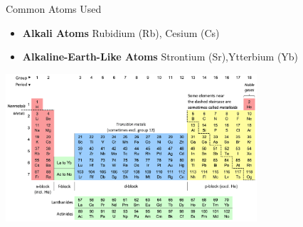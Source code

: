 \documentclass{beamer}
\begin{document}
\begin{frame}{Common Atoms Used}
  \begin{itemize}
    \item \textbf{Alkali Atoms} Rubidium (Rb), Cesium (Cs)
    \item \textbf{Alkaline-Earth-Like Atoms} Strontium (Sr),Ytterbium (Yb)
  \end{itemize}
  \centering
  \includegraphics[width=0.7\textwidth]{images/Colour_18-col_PT_with_labels.png}
\end{frame}
\end{document}
